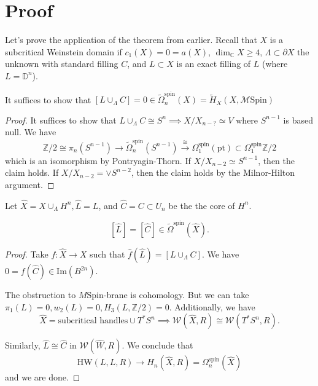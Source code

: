 \section{Proof}

Let's prove the application of the theorem from earlier. Recall that $X$ is a subcritical Weinstein domain if $c_1(X)=0=a(X)$, $\dim_{\mathbb{C}}X\ge 4$, $\Lambda \subset \partial X$ the unknown with standard filling $C$, and $L\subset X$ is an exact filling of $L$ (where $L=\mathbb{D}^n$).

\begin{proposition}

It suffices to show that $[L \cup_\Lambda C] =0 \in \tilde{\Omega}^{\text{spin}}_n (X) = \tilde{H}_X(X, \mathcal{M}\text{Spin})$

\end{proposition}

\begin{proof}
It suffices to show that $L\cup_\Lambda C \cong S^n \implies X/X_{n-?} \simeq V$ where $S^{n-1}$ is based null. We have 
\[\mathbb{Z}/2 \cong \pi_n(S^{n-1}) \to \tilde{\Omega}_n^{\text{spin}} (S^{n-1}) \stackrel{\cong}{\longrightarrow} \Omega_1^{\text{spin}}(\text{pt})\subset \Omega_1^{\text{spin}} \mathbb{Z}/2\]
which is an isomorphism by Pontryagin-Thorn. If $X/X_{n-2} \simeq S^{n-1}$, then the claim holds. If $X/X_{n-2} = \vee S^{n-2}$, then the claim holds by the Milnor-Hilton argument.
\end{proof}

Let $\hat{X}=X\cup_\Lambda H^n, \hat{L}=L$, and $\hat{C}= C \subset U_n$ be the the core of $H^n$.

\begin{proposition}

\[[\hat{L}]=[\hat{C}]\in \tilde{\Omega}^{\text{spin}}(\hat{X}).\]

\end{proposition}

\begin{proof}
Take $f:\hat{X}\to X$ such that $\hat{f}(\hat{L}) = [L\cup_\Lambda C]$. We have $0=f(\hat{C})\in \text{Im}(B^{2n})$.

The obstruction to $M\text{Spin}$-brane is cohomology. But we can take $\pi_1(L)=0, w_2(L)=0, H_3(L, \mathbb{Z}/2)=0$. Additionally, we have 
\[\hat{X}=\text{subcritical handles} \cup T^*S^n \implies \mathcal{W}(\hat{X}, R) \cong \mathcal{W}(T^*S^n, R).\]

Similarly, $\hat{L}\cong \hat{C}$ in $\mathcal{W}(\hat{W}, R)$. We conclude that
\[\text{HW}(L, L, R)\to H_n(\hat{X}, R) =\Omega_n^{\text{spin}}(\hat{X})\]
and we are done.
\end{proof}